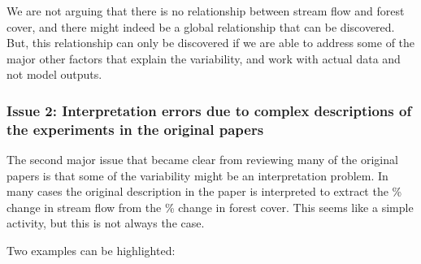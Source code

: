 \documentclass[]{elsarticle} %
\begin{document}
We are not arguing that there is no relationship between stream flow and forest cover, and there might indeed be a global relationship that can be discovered. But, this relationship can only be discovered if we are able to address some of the major other factors that explain the variability, and work with actual data and not model outputs.

\hypertarget{issue-2-interpretation-errors-due-to-complex-descriptions-of-the-experiments-in-the-original-papers}{%
\subsubsection{Issue 2: Interpretation errors due to complex descriptions of the experiments in the original papers}\label{issue-2-interpretation-errors-due-to-complex-descriptions-of-the-experiments-in-the-original-papers}}

The second major issue that became clear from reviewing many of the original papers is that some of the variability might be an interpretation problem. In many cases the original description in the paper is interpreted to extract the \% change in stream flow from the \% change in forest cover. This seems like a simple activity, but this is not always the case.

Two examples can be highlighted:
\end{document}
